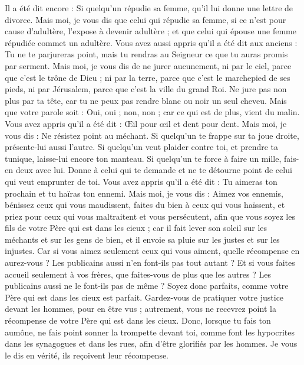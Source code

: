 \begin{multicols}{2}
Il a été dit encore : Si quelqu'un répudie sa femme, qu'il lui donne une lettre de divorce.
Mais moi, je vous dis que celui qui répudie sa femme, si ce n'est pour cause d'adultère, l'expose à devenir adultère ; et que celui qui épouse une femme répudiée commet un adultère.
Vous avez aussi appris qu'il a été dit aux anciens : Tu ne te parjureras point, mais tu rendras au Seigneur ce que tu auras promis par serment.
Mais moi, je vous dis de ne jurer aucunement, ni par le ciel, parce que c'est le trône de Dieu ;
ni par la terre, parce que c'est le marchepied de ses pieds, ni par Jérusalem, parce que c'est la ville du grand Roi.
Ne jure pas non plus par ta tête, car tu ne peux pas rendre blanc ou noir un seul cheveu.
Mais que votre parole soit : Oui, oui ; non, non ; car ce qui est de plus, vient du malin.
Vous avez appris qu'il a été dit : Œil pour œil et dent pour dent.
Mais moi, je vous dis : Ne résistez point au méchant. Si quelqu'un te frappe sur ta joue droite, présente-lui aussi l'autre.
Si quelqu'un veut plaider contre toi, et prendre ta tunique, laisse-lui encore ton manteau.
Si quelqu'un te force à faire un mille, fais-en deux avec lui.
Donne à celui qui te demande et ne te détourne point de celui qui veut emprunter de toi.
Vous avez appris qu'il a été dit : Tu aimeras ton prochain et tu haïras ton ennemi.
Mais moi, je vous dis : Aimez vos ennemis, bénissez ceux qui vous maudissent, faites du bien à ceux qui vous haïssent, et priez pour ceux qui vous maltraitent et vous persécutent,
afin que vous soyez les fils de votre Père qui est dans les cieux ; car il fait lever son soleil sur les méchants et sur les gens de bien, et il envoie sa pluie sur les justes et sur les injustes.
Car si vous aimez seulement ceux qui vous aiment, quelle récompense en aurez-vous ? Les publicains aussi n'en font-ils pas tout autant ?
Et si vous faites accueil seulement à vos frères, que faites-vous de plus que les autres ? Les publicains aussi ne le font-ils pas de même ?
Soyez donc parfaits, comme votre Père qui est dans les cieux est parfait.
\VerseOne{}Gardez-vous de pratiquer votre justice devant les hommes, pour en être vus ; autrement, vous ne recevrez point la récompense de votre Père qui est dans les cieux.
Donc, lorsque tu fais ton aumône, ne fais point sonner la trompette devant toi, comme font les hypocrites dans les synagogues et dans les rues, afin d'être glorifiés par les hommes. Je vous le dis en vérité, ils reçoivent leur récompense.

\end{multicols}
